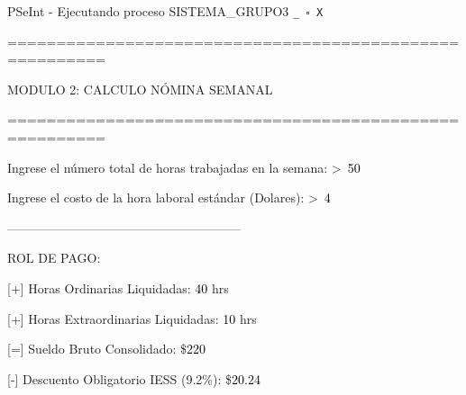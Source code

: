 \documentclass[12pt,a4paper]{article}
\newcommand{\consola}[1]{\noindent\textcolor{pseString}{#1}}
\newcommand{\entrada}[1]{\textcolor{black}{#1}}
\newenvironment{PSeIntWindow}{%
	\begin{tcolorbox}[
		breakable,
		enhanced,
		colback=white,
		colframe=black!60,
		boxrule=0.5pt,
		arc=1mm,
		left=0mm,
		right=0mm,
		top=0mm,
		bottom=2mm,
		width=\textwidth
		]
	}{%
	\end{tcolorbox}
}
\newcommand{\BarraPSeInt}{%
	\colorbox{gray!20}{%
		\parbox{\dimexpr\textwidth-2\fboxsep\relax}{%
			\small
			\textcolor{pseString}{\faPlayCircle}
			\hspace{0.3em}
			PSeInt - Ejecutando proceso SISTEMA\_GRUPO3
			\hfill
			\texttt{\_ \hspace{0.5em} \(\square\) \hspace{0.5em} X}
		}
	}
}
\begin{document}
	\begin{PSeIntWindow}
		
		\BarraPSeInt
		
		\vspace{0.2cm}
		
		\ttfamily
		\small
		
		\consola{========================================================}\par
		
		\begin{center}
			\textcolor{pseString}{MODULO 2: CALCULO NÓMINA SEMANAL}
		\end{center}
		
		\consola{========================================================}\par
		
		\vspace{0.3cm}
		
		\consola{Ingrese el número total de horas trabajadas en la semana: \textgreater\ }\entrada{50}\par
		
		\consola{Ingrese el costo de la hora laboral estándar (Dolares): \textgreater\ }\entrada{4}\par
		
		\vspace{0.3cm}
		
		\consola{--------------------------------------------------------}\par
		
		\vspace{0.2cm}
		
		\consola{ROL DE PAGO:}\par
		
		\vspace{0.2cm}
		
		\consola{\hspace*{0.5cm}[+] Horas Ordinarias Liquidadas: }\entrada{40}\consola{ hrs}\par
		
		\consola{\hspace*{0.5cm}[+] Horas Extraordinarias Liquidadas: }\entrada{10}\consola{ hrs}\par
		
		\consola{\hspace*{0.5cm}[=] Sueldo Bruto Consolidado: \$}\entrada{220}\par
		
		\consola{\hspace*{0.5cm}[-] Descuento Obligatorio IESS (9.2\%): \$}\entrada{20.24}\par
		

\end{PSeIntWindow}
\end{document}

